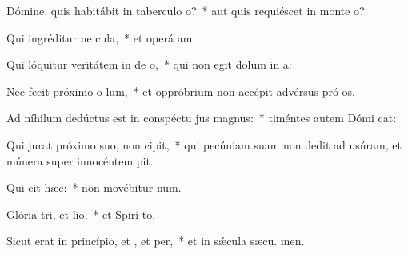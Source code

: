 \item Dómine, quis habitábit in taberculo o?~* aut quis requiéscet in monte  o?
\item Qui ingréditur ne cula,~* et operá am:
\item Qui lóquitur veritátem in de o,~* qui non egit dolum in  a:
\item Nec fecit próximo o lum,~* et oppróbrium non accépit advérsus pró os.
\item Ad níhilum dedúctus est in conspéctu jus magnus:~* timéntes autem Dómi cat:
\item Qui jurat próximo suo,  non cipit,~* qui pecúniam suam non dedit ad usúram, et múnera super innocéntem  pit.
\item Qui cit hæc:~* non movébitur  num.
\item Glória tri, et lio,~* et Spirí to.
\item Sicut erat in princípio, et , et per,~* et in sǽcula sæcu. men.
